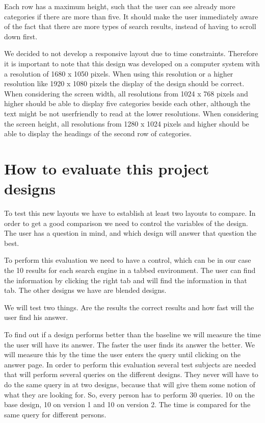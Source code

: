 \documentclass[12pt]{article}
\begin{document}
Each row has a maximum height, such that the user can see already more categories if there are more than five.
It should make the user immediately aware of the fact that there are more types of search results, instead of having to scroll down first.

We decided to not develop a responsive layout due to time constraints.
Therefore it is important to note that this design was developed on a computer system with a resolution of 1680 x 1050 pixels.
When using this resolution or a higher resolution like 1920 x 1080 pixels the display of the design should be correct.
When considering the screen width, all resolutions from 1024 x 768 pixels and higher should be able to display five categories beside each other, although the text might be not userfriendly to read at the lower resolutions.
When considering the screen height, all resolutions from 1280 x 1024 pixels and higher should be able to display the headings of the second row of categories.

\section{How to evaluate this project designs}
\label{sec:evaluation}
To test this new layouts we have to establish at least two layouts to compare. In order to get a good comparison we need to control the variables of the design. The user has a question in mind, and which design will answer that question the best. 

To perform this evaluation we need to have a control, which can be in our case the 10 results for each search engine in a tabbed environment. The user can find the information by clicking the right tab and will find the information in that tab. The other designs we have are blended designs.

We will test two things. Are the results the correct results and how fast will the user find his answer. 

To find out if a design performs better than the baseline we will measure the time the user will have its answer. The faster the user finds its answer the better. We will measure this by the time the user enters the query until clicking on the answer page. In order to perform this evaluation several test subjects are needed that will perform several queries on the different designs. They never will have to do the same query in at two designs, because that will give them some notion of what they are looking for. So, every person has to perform 30 queries. 10 on the base design, 10 on version 1 and 10 on version 2. The time is compared for the same query for different persons.
\end{document}
